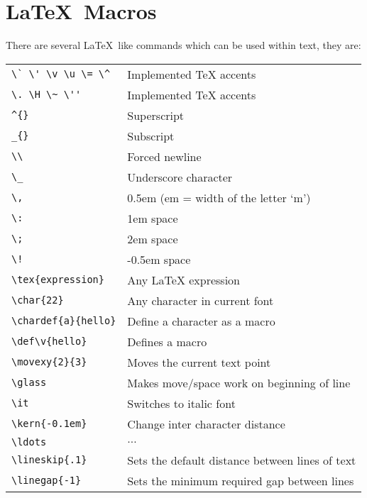 \newpage
\section{\LaTeX\ Macros}
\label{ltxsym:sec}

\index{\LaTeX} There are several \LaTeX\ like commands 
which can be used within text, they are:

\vspace{0.5cm}
\begin{tabular}{ll}
\verb+\` \' \v \u \= \^+    & Implemented TeX accents \\
\verb+\. \H \~ \''+         & Implemented TeX accents \\
\verb+^{}+                  & Superscript \\
\verb+_{}+                  & Subscript \\
\verb+\\+                   & Forced newline \\
\verb+\_+                   & Underscore character \\
\verb+\,+                   & 0.5em (em = width of the letter `m') \\
\verb+\:+                   & 1em space \\
\verb+\;+                   & 2em space \\
\verb+\!+                   & -0.5em space \\
\verb+\tex{expression}+     & Any LaTeX expression \\
\verb+\char{22}+            & Any character in current font \\
\verb+\chardef{a}{hello}+   & Define a character as a macro \\
\verb+\def\v{hello}+        & Defines a macro \\
\verb+\movexy{2}{3}+        & Moves the current text point \\
\verb+\glass+               & Makes move/space work on beginning of line \\
\verb+\it+                  & Switches to italic font \\ 
\verb+\kern{-0.1em}+        & Change inter character distance \\
\verb+\ldots+               & $\ldots$ \\
\verb+\lineskip{.1}+        & Sets the default distance between lines of text \\
\verb+\linegap{-1}+         & Sets the minimum required gap between lines \\

\end{tabular}
